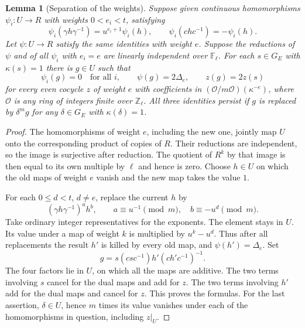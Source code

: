 \documentclass[a4paper,11pt]{article}
\newtheorem{lemma}[proposition]{Lemma}
\theoremstyle{definition}
\theoremstyle{remark}
\newcommand{\ZZ}{\mathbb Z}\newcommand{\ord}{\operatorname{ord}}
\numberwithin{equation}{section}
\begin{document}
\begin{lemma}[Separation of the weights]\leavevmode
\label{lem:separateweights713}
Suppose given continuous homomorphisms \(\psi_i:U\to R\) with
weights \(0<e_i<t\), satisfying
\[
 \psi_i(\gamma h\gamma^{-1})=u^{e_i+1}\psi_i(h),
 \qquad \psi_i(chc^{-1})=-\psi_i(h).
\]
Let \(\psi:U\to R\) satisfy the same identities with weight \(e\).
Suppose the reductions of \(\psi\) and of all \(\psi_i\) with
\(e_i=e\) are linearly independent over \(\mathbb F_\ell\).
For each \(s\in G_E\) with \(\kappa(s)=1\) there is \(g\in U\)
such that
\[
 \psi_i(g)=0\quad\text{for all }i,\qquad
 \psi(g)=2\Delta_e,\qquad z(g)=2z(s)
\]
for every even cocycle \(z\) of weight \(e\) with coefficients
in \((\mathcal O/m\mathcal O)(\kappa^{-e})\), where
\(\mathcal O\) is any ring of integers finite over \(\ZZ_\ell\).
All three identities persist if \(g\) is replaced by \(\delta^m g\)
for any \(\delta\in G_E\) with \(\kappa(\delta)=1\).
\end{lemma}
\begin{proof}
The homomorphisms of weight \(e\), including the new one, jointly
map \(U\) onto the corresponding product of copies of \(R\).
Their reductions are independent, so the image is surjective
after reduction. The quotient of \(R^k\) by that image is then
equal to its own multiple by \(\ell\) and hence is zero. Choose
\(h\in U\) on which the old maps of weight \(e\) vanish and the
new map takes the value \(1\).

For each \(0\le d<t\), \(d\ne e\), replace the current \(h\) by
\[
       (\gamma h\gamma^{-1})^{a}h^{b},
       \qquad a\equiv u^{-1}\pmod m,\quad b\equiv-u^d\pmod m .
\]
Take ordinary integer representatives for the exponents. The
element stays in \(U\). Its value under a map of weight \(k\)
is multiplied by \(u^k-u^d\). Thus after all replacements the
result \(h'\) is killed by every old map, and
\(\psi(h')=\Delta_e\). Set
\[
         g=s(csc^{-1})h'(ch'c^{-1})^{-1}.
\]
The four factors lie in \(U\), on which all the maps are
additive. The two terms involving \(s\) cancel for the dual
maps and add for \(z\). The two terms involving \(h'\) add
for the dual maps and cancel for \(z\). This proves the
formulas. For the last assertion, \(\delta\in U\), hence
\(m\) times its value vanishes under each of the homomorphisms
in question, including \(z|_U\).
\end{proof}
\end{document}

